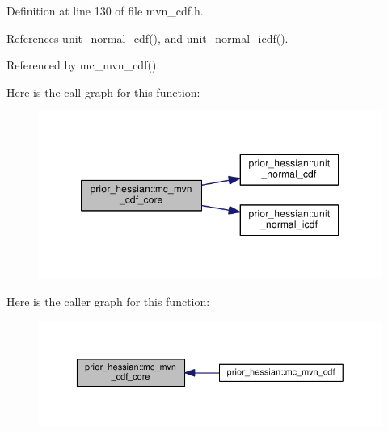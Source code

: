 Definition at line 130 of file mvn\+\_\+cdf.\+h.



References unit\+\_\+normal\+\_\+cdf(), and unit\+\_\+normal\+\_\+icdf().



Referenced by mc\+\_\+mvn\+\_\+cdf().



Here is the call graph for this function\+:\nopagebreak
\begin{figure}[H]
\begin{center}
\leavevmode
\includegraphics[width=320pt]{namespaceprior__hessian_af30ccf313fd6eced8ae174f6a0d8457b_cgraph}
\end{center}
\end{figure}




Here is the caller graph for this function\+:\nopagebreak
\begin{figure}[H]
\begin{center}
\leavevmode
\includegraphics[width=350pt]{namespaceprior__hessian_af30ccf313fd6eced8ae174f6a0d8457b_icgraph}
\end{center}
\end{figure}


